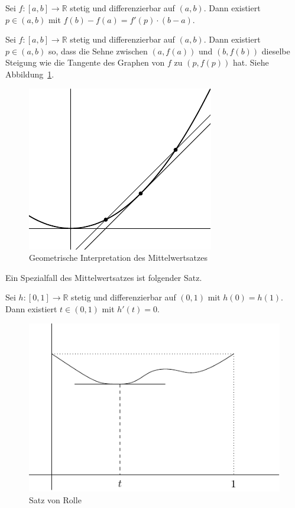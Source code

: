 \documentclass[../main.tex]{subfiles}
\begin{document}
\begin{meanvalue}
  Sei $f \colon [a, b] \to \mathbb{R}$ 
  stetig und differenzierbar auf $(a, b)$.
  Dann existiert $p \in (a, b)$ mit $f(b) - f(a)
  = f'(p) \cdot (b-a)$.
\end{meanvalue}

\begin{geometric}
  Sei $ f \colon [a, b] \to \mathbb{R}$ stetig
  und differenzierbar auf $(a, b)$.
  Dann existiert $p \in (a, b)$ so, dass
  die Sehne zwischen $(a, f(a))$ und
  $(b, f(b))$ dieselbe Steigung
  wie die Tangente des Graphen von $f$ zu $
  (p, f(p))$ hat. Siehe Abbildung~\ref{fig:meanvalue}.
\end{geometric}

\begin{figure}[htb]
  \centering
  \includegraphics{images/meanvalue}
  \caption{Geometrische Interpretation
  des Mittelwertsatzes}%
  \label{fig:meanvalue}
\end{figure}

Ein Spezialfall des Mittelwertsatzes ist folgender Satz.

\begin{rolle}
  Sei $h \colon [0, 1] \to \mathbb{R}$ stetig
  und differenzierbar auf $(0, 1)$ 
  mit $h(0) = h(1)$.
  Dann existiert $t \in (0, 1)$ 
  mit $h'(t) = 0$.
\end{rolle}

\begin{figure}[htb]
  \centering
  \includegraphics{images/rolle}
  \caption{Satz von Rolle}%
  \label{fig:rolle}
\end{figure}
\end{document}
